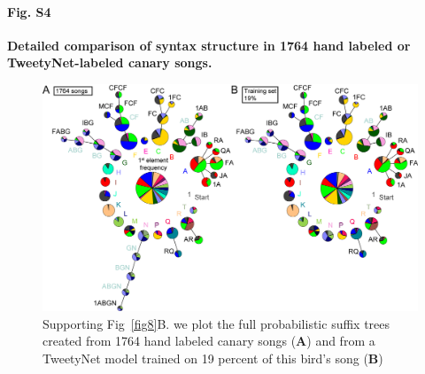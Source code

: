 \documentclass[10pt,letterpaper]{article}
\begin{document}
\paragraph*{Fig. S4}
\label{S4_Fig}
{\bf Detailed comparison of syntax structure in 1764 hand labeled or TweetyNet-labeled canary songs.}
\begin{figure}[!ht]
\includegraphics[scale=0.85]{Figures/fig9/Figure9_v3.png}
\caption{Supporting Fig~\ref{fig8}B. we plot the full probabilistic suffix trees created from 1764 hand labeled canary songs ({\bf A}) and from a TweetyNet model trained on 19 percent of this bird's song ({\bf B})}
\label{supp_fig_4}
\end{figure}


\nolinenumbers

%
%
% 






\end{document}
